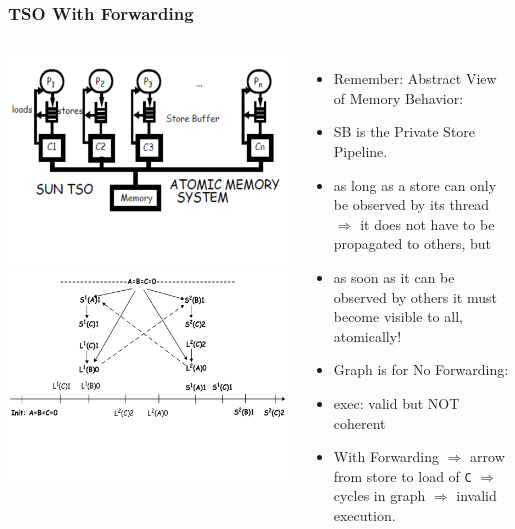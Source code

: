 \documentclass{beamer}
\renewcommand{\emph}[1]{\textcolor{structure}{#1}}
\newcommand{\emp}[1]{\textcolor{DikuRed}{ #1}}
\begin{document}
\begin{frame}[fragile,t]
\frametitle{TSO With Forwarding}

\begin{columns}
\includegraphics[width=39ex]{Ch7Figs/TSOfwd}\\\vspace{-5ex}
\includegraphics[width=39ex]{Ch7Figs/TSOfwdGraph}\pause
{}
\vspace{-9ex}
\begin{itemize}
    \item \alert{Remember: Abstract View of Memory Behavior:}
    \item SB is the Private Store Pipeline.
    \item as long as a store can only be observed by its thread $\Rightarrow$
            it does not have to be propagated to others, but
    \item as soon as it can be observed by others it must become visible to all, atomically!
    \item \emp{Graph is for No Forwarding:}
    \item exec: valid but NOT coherent
    \item \emph{With Forwarding $\Rightarrow$ arrow from store to load of {\tt C} $\Rightarrow$ cycles in graph $\Rightarrow$ invalid execution.}
\end{itemize}
\end{columns}
\end{frame}
\end{document}
